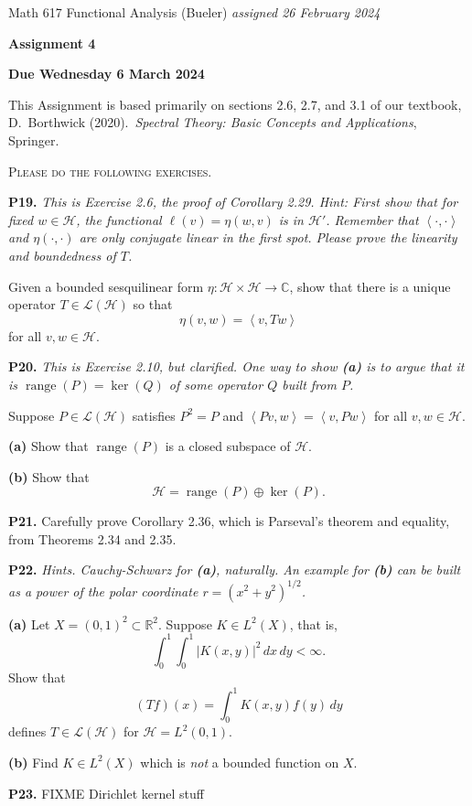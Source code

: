 \documentclass[12pt]{amsart}
\newcommand{\cH}{\mathcal{H}}
\newcommand{\cL}{\mathcal{L}}
\newcommand{\CC}{\mathbb{C}}
\newcommand{\RR}{\mathbb{R}}
\newcommand{\ip}[2]{\ensuremath{\left<#1,#2\right>}}
\newcommand{\range}{\operatorname{range}}
\newcommand{\prob}[1]{\bigskip\noindent\textbf{#1.}\quad }
\newcommand{\epart}[1]{\medskip\noindent\textbf{(#1)}\quad }
\begin{document}
\scriptsize \noindent Math 617 Functional Analysis (Bueler) \hfill \emph{assigned 26 February 2024}
\normalsize\medskip

\Large\centerline{\textbf{Assignment 4}}
\large
\medskip

\centerline{\textbf{Due Wednesday 6 March 2024}}
\medskip
\normalsize

\thispagestyle{empty}

\bigskip
\noindent This Assignment is based primarily on sections 2.6, 2.7, and 3.1 of our textbook, D.~Borthwick (2020).~\emph{Spectral Theory: Basic Concepts and Applications}, Springer.

\medskip
\noindent \textsc{Please do the following exercises.}
\smallskip

\prob{P19}  \emph{This is Exercise 2.6, the proof of Corollary 2.29.  Hint: First show that for fixed $w\in\cH$, the functional $\ell(v) = \eta(w,v)$ is in $\cH'$.  Remember that $\ip{\cdot}{\cdot}$ and $\eta(\cdot,\cdot)$ are only conjugate linear in the first spot.  Please prove the linearity and boundedness of $T$.}

\medskip\noindent Given a bounded sesquilinear form $\eta:\cH\times \cH \to \CC$, show that there is a unique operator $T\in \cL(\cH)$ so that
	$$\eta(v,w) = \ip{v}{Tw}$$
for all $v,w\in\cH$.


\prob{P20}  \emph{This is Exercise 2.10, but clarified.  One way to show \emph{\textbf{(a)}} is to argue that it is $\range(P)=\ker(Q)$ of some operator $Q$ built from $P$.}

\medskip\noindent Suppose $P\in\cL(\cH)$ satisfies $P^2=P$ and $\ip{Pv}{w} = \ip{v}{Pw}$ for all $v,w\in\cH$.

\epart{a}  Show that $\range(P)$ is a closed subspace of $\cH$.

\epart{b}  Show that
	$$\cH = \range(P) \oplus \ker(P).$$


\prob{P21}  Carefully prove Corollary 2.36, which is Parseval's theorem and equality, from Theorems 2.34 and 2.35.


\prob{P22}  \emph{Hints.  Cauchy-Schwarz for \emph{\textbf{(a)}}, naturally.  An example for \emph{\textbf{(b)}} can be built as a power of the polar coordinate $r=(x^2+y^2)^{1/2}$.}

\epart{a}  Let $X=(0,1)^2 \subset \RR^2$.  Suppose $K \in L^2(X)$, that is,
	$$\int_0^1 \int_0^1 |K(x,y)|^2\,dx\,dy < \infty.$$
Show that
	$$(Tf)(x) = \int_0^1 K(x,y) f(y)\,dy$$
defines $T\in\cL(\cH)$ for $\cH = L^2(0,1)$.

\epart{b} Find $K \in L^2(X)$ which is \emph{not} a bounded function on $X$.


\prob{P23}  FIXME Dirichlet kernel stuff
\end{document}
